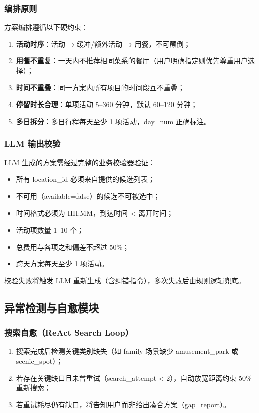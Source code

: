 \documentclass[12pt,a4paper]{ctexart}
\begin{document}
\subsubsection{编排原则}

方案编排遵循以下硬约束：

\begin{enumerate}[label=(\arabic*)]
  \item \textbf{活动时序}：活动 → 缓冲/额外活动 → 用餐，不可颠倒；
  \item \textbf{用餐不重复}：一天内不推荐相同菜系的餐厅（用户明确指定则优先尊重用户选择）；
  \item \textbf{时间不重叠}：同一方案内所有项目的时间段互不重叠；
  \item \textbf{停留时长合理}：单项活动 5--360 分钟，默认 60--120 分钟；
  \item \textbf{多日拆分}：多日行程每天至少 1 项活动，day\_num 正确标注。
\end{enumerate}

\subsubsection{LLM 输出校验}

LLM 生成的方案需经过完整的业务校验器验证：

\begin{itemize}
  \item 所有 location\_id 必须来自提供的候选列表；
  \item 不可用（available=false）的候选不可被选中；
  \item 时间格式必须为 HH:MM，到达时间 < 离开时间；
  \item 活动项数量 1--10 个；
  \item 总费用与各项之和偏差不超过 50\%；
  \item 跨天方案每天至少 1 项活动。
\end{itemize}

校验失败将触发 LLM 重新生成（含纠错指令），多次失败后由规则逻辑兜底。

\subsection{异常检测与自愈模块}

\subsubsection{搜索自愈（ReAct Search Loop）}

\begin{enumerate}[label=(\arabic*)]
  \item 搜索完成后检测关键类别缺失（如 family 场景缺少 amusement\_park 或 scenic\_spot）；
  \item 若存在关键缺口且未曾重试（search\_attempt < 2），自动放宽距离约束 50\% 重新搜索；
  \item 若重试耗尽仍有缺口，将告知用户而非给出凑合方案（gap\_report）。
\end{enumerate}
\end{document}
